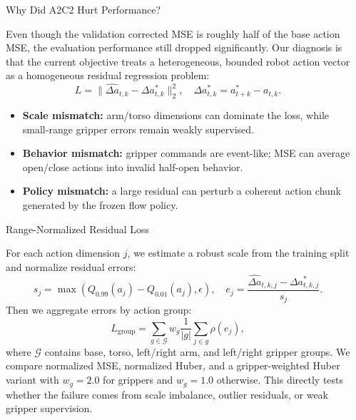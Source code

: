 \documentclass[final]{beamer}
\newlength{\sepwidth}
\newlength{\colwidth}
\newcommand{\separatorcolumn}{\begin{column}{\sepwidth}\end{column}}
\begin{document}
\begin{frame}[t]
\begin{columns}[t]
\begin{column}{\colwidth}
			\begin{alertblock}{Why Did A2C2 Hurt Performance?}
				
				Even though the validation corrected MSE is roughly half of the base action MSE, 
				the evaluation performance still dropped significantly.
				Our diagnosis is that the current objective treats
				a heterogeneous, bounded robot action vector as a homogeneous residual
				regression problem:
				$$
				L = \|\hat{\Delta a}_{t,k} - \Delta a^*_{t,k}\|_2^2, 
				\quad
				\Delta a^*_{t,k} = a^*_{t+k} - a_{t,k}.
				$$
				
				\begin{itemize}
					\item \textbf{Scale mismatch:} arm/torso dimensions can dominate the loss,
					while small-range gripper errors remain weakly supervised.
					\item \textbf{Behavior mismatch:} gripper commands are event-like; MSE can
					average open/close actions into invalid half-open behavior.
					\item \textbf{Policy mismatch:} a large residual can perturb a coherent
					action chunk generated by the frozen flow policy.
				\end{itemize}
				
			\end{alertblock}

			\begin{defbox}{Range-Normalized Residual Loss}

				For each action dimension $j$, we estimate a robust scale from the training
				split and normalize residual errors:
				$$
				s_j = \max\left(Q_{0.99}(a_j)-Q_{0.01}(a_j), \epsilon\right),
				\quad
				e_j = \frac{\hat{\Delta a}_{t,k,j} - \Delta a^*_{t,k,j}}{s_j}.
				$$
				Then we aggregate errors by action group:
				$$
				L_{\text{group}} =
				\sum_{g \in \mathcal{G}} w_g
				\frac{1}{|g|}\sum_{j \in g} \rho(e_j),
				$$
				where $\mathcal{G}$ contains base, torso, left/right arm, and left/right
				gripper groups. We compare normalized MSE, normalized Huber, and a
				gripper-weighted Huber variant with $w_g=2.0$ for grippers and $w_g=1.0$
				otherwise. This directly tests whether the failure comes from scale
				imbalance, outlier residuals, or weak gripper supervision.

			\end{defbox}
			
		\end{column}
	
		\separatorcolumn
		

\end{columns}
\end{frame}
\end{document}
